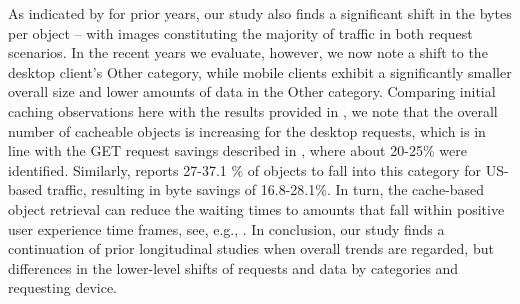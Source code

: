 \documentclass[journal,final]{IEEEtran}
\begin{document}
As indicated by \cite{IhPa11} for prior years, our study also finds a significant shift in the bytes per object -- with  images constituting the majority of traffic in both request scenarios.
In the recent years we evaluate, however, we now note a shift to the desktop client's Other category, while mobile clients exhibit a significantly smaller overall size and lower amounts of data in the Other category.
Comparing initial caching observations here with the results provided in  \cite{CaAlPa10,IhPa11}, we note that the overall number of cacheable objects is increasing for the desktop requests, which is in line with the GET request savings described in \cite{CaAlPa10}, where about 20-25\% were identified.
Similarly, \cite{IhPa11} reports 27-37.1 \% of objects to fall into this category for US-based traffic, resulting in byte savings of 16.8-28.1\%.
In turn,  the cache-based object retrieval can reduce the waiting times to amounts that fall within positive user experience time frames, see, e.g., \cite{NiUeNa10}.
In conclusion, our study finds a continuation of prior longitudinal studies when overall trends are regarded, but differences in the lower-level shifts of requests and data by categories and requesting device.
\end{document}
